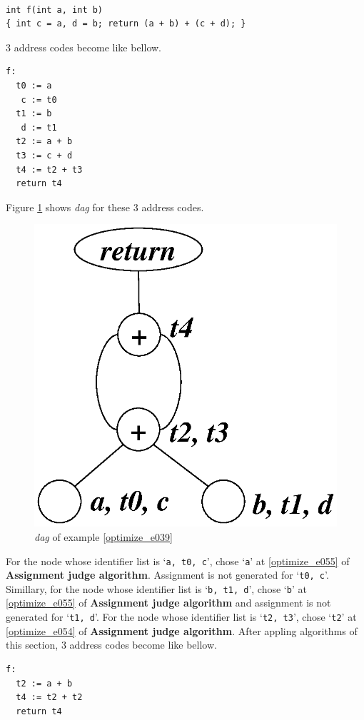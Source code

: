 \begin{Example}
\label{optimize_e039}
\begin{verbatim}

int f(int a, int b)
{ int c = a, d = b; return (a + b) + (c + d); }
\end{verbatim}
3 address codes become like bellow.
\begin{verbatim}
f:
  t0 := a
   c := t0
  t1 := b
   d := t1
  t2 := a + b
  t3 := c + d
  t4 := t2 + t3
  return t4
\end{verbatim}
Figure \ref{optimize_e040} shows {\em dag} for these 3 address codes.
\begin{figure}[htbp]
\begin{center}
\includegraphics[width=0.724\linewidth,height=0.7\linewidth]{opt021.eps}
\caption{{\em dag} of example \ref{optimize_e039}}
\label{optimize_e040}
\end{center}
\end{figure}
For the node whose identifier list is `{\tt{a, t0, c}}',
chose `{\tt{a}}' at \ref{optimize_e055} of {\bf Assignment judge algorithm}.
Assignment is not generated for `{\tt{t0, c}}'.
Simillary, for the node whose identifier list is `{\tt{b, t1, d}}',
chose `{\tt{b}}' at \ref{optimize_e055}
of {\bf Assignment judge algorithm} and
assignment is not generated for `{\tt{t1, d}}'.
For the node whose identifier list is `{\tt{t2, t3}}',
chose `{\tt{t2}}' at \ref{optimize_e054}
of {\bf Assignment judge algorithm}.
After appling algorithms of this section,
3 address codes become like bellow.
\begin{verbatim}
f:
  t2 := a + b
  t4 := t2 + t2
  return t4
\end{verbatim}
\end{Example}

